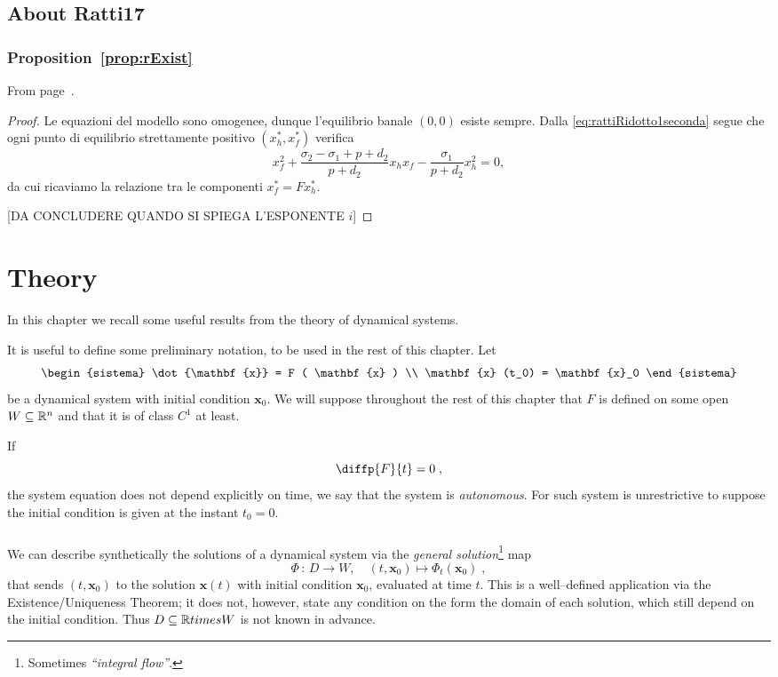 \section{About Ratti17}
\subsection{ Proposition~\ref{prop:rExist} }
From page~\pageref{prop:rExist}.

\begin{proof}
    Le equazioni del modello sono omogenee, dunque l'equilibrio banale $(0,0)$ esiste sempre.
    Dalla \eqref{eq:rattiRidotto1seconda} segue che ogni punto di equilibrio strettamente positivo $(x_h^*, x_f^*)$ verifica
    $$x_f^2 + \frac{\sigma_2 - \sigma_1 + p + d_2}{p +d_2} x_h x_f - \frac{\sigma_1}{p+d_2} x_h^2 = 0,$$
    da cui ricaviamo la relazione tra le componenti $x_f^* = F x_h^*$.

    [DA CONCLUDERE QUANDO SI SPIEGA L'ESPONENTE $i$] %
\end{proof}








\chapter{Theory}

In this chapter we recall some useful results from the theory of dynamical systems.

It is useful to define some preliminary notation, to be used in the rest of this chapter.
Let
$$\begin{sistema}
\dot{\mathbf{x}} = F ( \mathbf{x} ) \\
\mathbf{x} (t_0) = \mathbf{x}_0
\end{sistema}$$
be a dynamical system with initial condition $\mathbf{x}_0$. We will suppose throughout the rest of this
chapter that $F$ is defined on some open $W \subseteq \mathbb{R}^n$ and that it is of class $C^1$ at least.

If
$$\diffp{F}{t} = 0 \; ,$$
\ie the system equation does not depend explicitly on time, we say that the system is \emph{autonomous}.
For such system is unrestrictive to suppose the initial condition is given at the instant $t_0=0$.

\paragraph{}
We can describe synthetically the solutions of a dynamical system via the \emph{general solution}\footnote{Sometimes
\emph{``integral flow''}.} map
$$\Phi \, : \, D \to W, \quad (t, \mathbf{x}_0 ) \mapsto \Phi_t ( \mathbf{x}_0 ) \; ,$$
that sends $(t, \mathbf{x}_0 )$ to the solution $\mathbf{x} (t)$ with initial condition $\mathbf{x}_0$, evaluated at time $t$. This is a well--defined application via the Existence/Uniqueness Theorem; it does not, however,
state any condition on the form the domain of each solution, which still depend on the initial condition.
Thus $D \subseteq \mathbb{R} times W$ is not known in advance.

